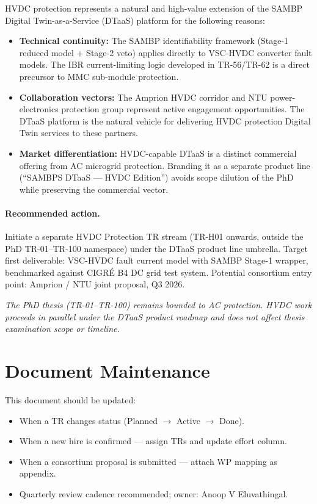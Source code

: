 \documentclass[11pt, a4paper]{article}
\begin{document}
HVDC protection represents a natural and high-value extension of the SAMBP
Digital Twin-as-a-Service (DTaaS) platform for the following reasons:

\begin{itemize}
  \item \textbf{Technical continuity:} The SAMBP identifiability framework
        (Stage-1 reduced model + Stage-2 veto) applies directly to VSC-HVDC
        converter fault models. The IBR current-limiting logic developed in
        TR-56/TR-62 is a direct precursor to MMC sub-module protection.
  \item \textbf{Collaboration vectors:} The Amprion HVDC corridor and NTU
        power-electronics protection group represent active engagement
        opportunities. The DTaaS platform is the natural vehicle for
        delivering HVDC protection Digital Twin services to these partners.
  \item \textbf{Market differentiation:} HVDC-capable DTaaS is a distinct
        commercial offering from AC microgrid protection. Branding it as a
        separate product line (``SAMBPS DTaaS — HVDC Edition'') avoids scope
        dilution of the PhD while preserving the commercial vector.
\end{itemize}

\paragraph{Recommended action.}
Initiate a separate HVDC Protection TR stream (TR-H01 onwards, outside the
PhD TR-01–TR-100 namespace) under the DTaaS product line umbrella. Target
first deliverable: VSC-HVDC fault current model with SAMBP Stage-1 wrapper,
benchmarked against CIGRÉ B4 DC grid test system. Potential consortium entry
point: Amprion / NTU joint proposal, Q3 2026.

\medskip
\noindent\textit{The PhD thesis (TR-01–TR-100) remains bounded to AC protection.
HVDC work proceeds in parallel under the DTaaS product roadmap and does not
affect thesis examination scope or timeline.}

\section{Document Maintenance}

This document should be updated:
\begin{itemize}
  \item When a TR changes status (Planned $\to$ Active $\to$ Done).
  \item When a new hire is confirmed — assign TRs and update effort column.
  \item When a consortium proposal is submitted — attach WP mapping as appendix.
  \item Quarterly review cadence recommended; owner: Anoop V Eluvathingal.
\end{itemize}
\end{document}
